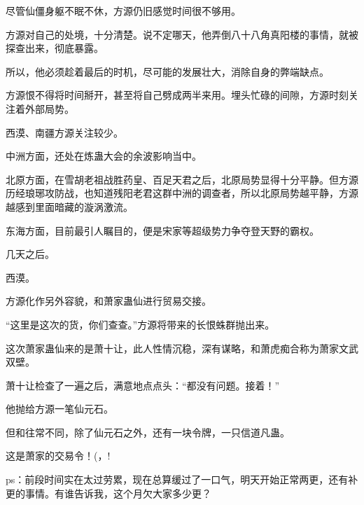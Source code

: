 \begin{this_body}
尽管仙僵身躯不眠不休，方源仍旧感觉时间很不够用。

方源对自己的处境，十分清楚。说不定哪天，他弄倒八十八角真阳楼的事情，就被探查出来，彻底暴露。

所以，他必须趁着最后的时机，尽可能的发展壮大，消除自身的弊端缺点。

方源恨不得将时间掰开，甚至将自己劈成两半来用。埋头忙碌的间隙，方源时刻关注着外部局势。

西漠、南疆方源关注较少。

中洲方面，还处在炼蛊大会的余波影响当中。

北原方面，在雪胡老祖战胜药皇、百足天君之后，北原局势显得十分平静。但方源历经琅琊攻防战，也知道残阳老君这群中洲的调查者，所以北原局势越平静，方源越感到里面暗藏的漩涡激流。

东海方面，目前最引人瞩目的，便是宋家等超级势力争夺登天野的霸权。

几天之后。

西漠。

方源化作另外容貌，和萧家蛊仙进行贸易交接。

“这里是这次的货，你们查查。”方源将带来的长恨蛛群抛出来。

这次萧家蛊仙来的是萧十让，此人性情沉稳，深有谋略，和萧虎痴合称为萧家文武双壁。

萧十让检查了一遍之后，满意地点点头：“都没有问题。接着！”

他抛给方源一笔仙元石。

但和往常不同，除了仙元石之外，还有一块令牌，一只信道凡蛊。

这是萧家的交易令！(，!

ps：前段时间实在太过劳累，现在总算缓过了一口气，明天开始正常两更，还有补更的事情。有谁告诉我，这个月欠大家多少更？

\end{this_body}

